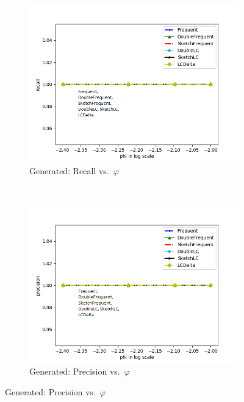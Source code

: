 \documentclass[sigconf,review=true,anonymous=true,screen]{acmart}
\renewcommand{\phi}{\varphi}
\begin{document}
\begin{figure}
\begin{subfigure}[b]{0.5\textwidth}
\includegraphics[width=\textwidth]{../Plots/recall_phi.png}
\caption{Generated: Recall vs.~$\phi$}
\end{subfigure}
~
\begin{subfigure}[b]{0.5\textwidth}
\includegraphics[width=\textwidth]{../Plots/precision_phi.png}
\caption{Generated: Precision vs.~$\phi$}
\end{subfigure}
\end{figure}


%



% 
\end{document}
